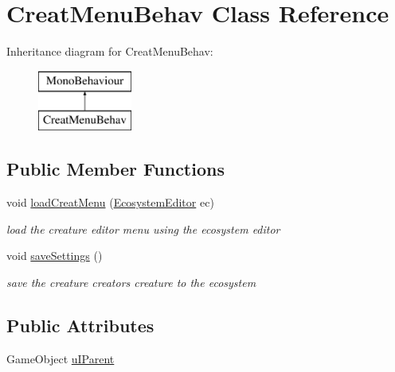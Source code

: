 \hypertarget{class_creat_menu_behav}{}\section{Creat\+Menu\+Behav Class Reference}
\label{class_creat_menu_behav}
Inheritance diagram for Creat\+Menu\+Behav\+:\begin{figure}[H]
\begin{center}
\leavevmode
\includegraphics[height=2.000000cm]{class_creat_menu_behav}
\end{center}
\end{figure}
\subsection*{Public Member Functions}
\begin{DoxyCompactItemize}
\item 
void \mbox{\hyperlink{class_creat_menu_behav_a499eb1392e87f87a2acc080f00b4d2d5}{load\+Creat\+Menu}} (\mbox{\hyperlink{class_ecosystem_editor}{Ecosystem\+Editor}} ec)
\begin{DoxyCompactList}\small\item\em load the creature editor menu using the ecosystem editor \end{DoxyCompactList}\item 
void \mbox{\hyperlink{class_creat_menu_behav_a598bb35515126390ef8b93334b7c1044}{save\+Settings}} ()
\begin{DoxyCompactList}\small\item\em save the creature creator\textquotesingle{}s creature to the ecosystem \end{DoxyCompactList}\end{DoxyCompactItemize}
\subsection*{Public Attributes}
\begin{DoxyCompactItemize}
\item 
Game\+Object \mbox{\hyperlink{class_creat_menu_behav_a6fefbf26f7a00f949815efc0f6415cd5}{u\+I\+Parent}}
\end{DoxyCompactItemize}


